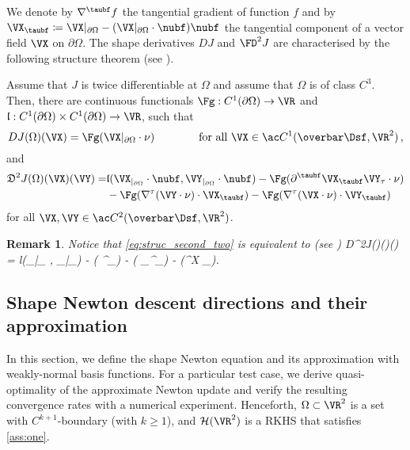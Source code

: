 \documentclass{siamart1116}
\newtheorem{remark}[theorem]{Remark}
\numberwithin{theorem}{section}
\begin{document}
We denote by $\nabla^{\taubf} f$ the tangential gradient of function $f$ and by
$\VX_{\taubf}\coloneqq \VX|_{\partial \Omega}- (\VX|_{\partial \Omega}\cdot \nubf) \nubf$
the tangential component of a vector field $\VX$ on $\partial \Omega$.
The shape derivatives $DJ$ and $\FD^2J$ are characterised by the
following structure theorem (see \cite{sturm3,NOPI02}).

\begin{theorem}\label{thm:structure_second}
Assume that $J$ is twice differentiable at $\Omega$ and assume that $\Omega$ is of class $C^3$.
Then, there are continuous functionals $\Fg: C^1(\partial \Omega) \to \VR$ and $\mathfrak l:C^1(\partial \Omega)\times C^1(\partial \Omega) \to \VR$, such that
\begin{equation}
DJ(\Omega)(\VX) = \Fg (\VX|_{\partial \Omega}\cdot \nu)
\qquad\qquad \text{for all } \VX\in \ac C^1(\overbar\Dsf,\VR^2)\,,
\end{equation} 
and 
\begin{equation}\label{eq:struc_second_two}
\begin{split}
\mathfrak D^2J(\Omega)(\VX)(\VY) =&  \mathfrak l(\VX_{|_{\partial \Omega}}\cdot 
\nubf, \VY_{|_{\partial \Omega}}\cdot \nubf) - 
\Fg(\partial^{\taubf}\VX_{\taubf}\VY_\tau\cdot \nu )\\
&-	\Fg(\nabla^\tau(\VY\cdot \nu)\cdot \VX_{\taubf}) - \Fg(\nabla^\tau(\VX\cdot \nu)\cdot \VY_{\taubf})
\end{split}
\end{equation}
for all $\VX,\VY\in \ac C^2(\overbar\Dsf,\VR^2)$.
\end{theorem}

\begin{remark}
	Notice that \cref{eq:struc_second_two} is equivalent to (see  \cite{NOPI02})
	\ben
	\mathfrak D^2J(\Omega)(\VX)(\VY) =  \mathfrak l(\VX_{|_{\partial \Omega}}\cdot 
	\nu, \VY_{|_{\partial \Omega}}\cdot \nu) - \Fg( \nu \cdot \partial^{\taubf}\VY \VX_{\taubf}) -  \Fg( \VY_{\taubf}\cdot \partial^{\taubf}\nu \VX_{\taubf}) - \Fg(\nu\cdot \partial^{\taubf}X \VY_{\taubf}).
	\een
\end{remark}

\subsection{Shape Newton descent directions and their approximation}
In this section, we define the shape Newton equation and its approximation
with weakly-normal basis functions. For a particular test case, we derive
quasi-optimality of the approximate Newton update and verify the resulting
convergence rates with a numerical experiment.
Henceforth, $\Omega\subset \VR^2$ is a set with $C^{k+1}$-boundary (with $k\ge 1$),
and $\mathcal H(\VR^2)$ is a RKHS that satisfies \cref{ass:one}.
\end{document}

